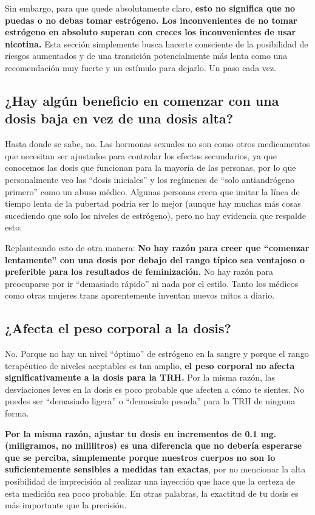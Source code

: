 \documentclass{article}
\begin{document}
Sin embargo, para que quede absolutamente claro, \textbf{esto no significa que no puedas o no debas tomar estrógeno. Los inconvenientes de no tomar estrógeno en absoluto superan con creces los inconvenientes de usar nicotina.} Esta sección simplemente busca hacerte consciente de la posibilidad de riesgos aumentados y de una transición potencialmente más lenta como una recomendación muy fuerte y un estímulo para dejarlo. Un paso cada vez.

\subsection{¿Hay algún beneficio en comenzar con una dosis baja en vez de una dosis alta?}

Hasta donde se sabe, no. Las hormonas sexuales no son como otros medicamentos que necesitan ser ajustados para controlar los efectos secundarios, ya que conocemos las dosis que funcionan para la mayoría de las personas, por lo que personalmente veo las “dosis iniciales” y los regímenes de “solo antiandrógeno primero” como un abuso médico. Algunas personas creen que imitar la línea de tiempo lenta de la pubertad podría ser lo mejor (aunque hay muchas más cosas sucediendo que solo los niveles de estrógeno), pero no hay evidencia que respalde esto.

Replanteando esto de otra manera: \textbf{No hay razón para creer que “comenzar lentamente” con una dosis por debajo del rango típico sea ventajoso o preferible para los resultados de feminización.} No hay razón para preocuparse por ir “demasiado rápido” ni nada por el estilo. Tanto los médicos como otras mujeres trans aparentemente inventan nuevos mitos a diario.

\subsection{¿Afecta el peso corporal a la dosis?}

No. Porque no hay un nivel “óptimo” de estrógeno en la sangre y porque el rango terapéutico de niveles aceptables es tan amplio, \textbf{el peso corporal no afecta significativamente a la dosis para la TRH.} Por la misma razón, las desviaciones leves en la dosis es poco probable que afecten a cómo te sientes. No puedes ser “demasiado ligera” o “demasiado pesada” para la TRH de ninguna forma.

\textbf{Por la misma razón, ajustar tu dosis en incrementos de 0.1 mg. (miligramos, no mililitros) es una diferencia que no debería esperarse que se perciba, simplemente porque nuestros cuerpos no son lo suficientemente sensibles a medidas tan exactas}, por no mencionar la alta posibilidad de imprecisión al realizar una inyección que hace que la certeza de esta medición sea poco probable. En otras palabras, la exactitud de tu dosis es más importante que la precisión.
\end{document}
